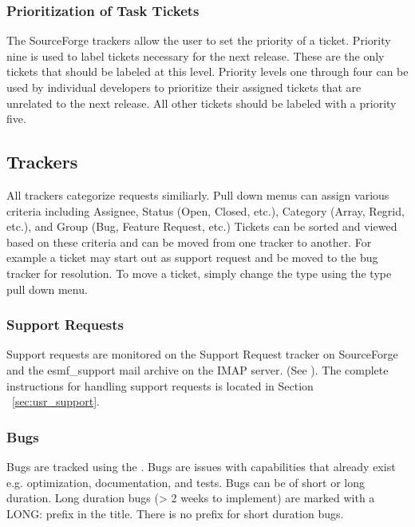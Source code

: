 \subsubsection{Prioritization of Task Tickets}

The SourceForge trackers allow the user to set the priority of a ticket. Priority nine is used to label tickets necessary for the next release. These are the only tickets that should be labeled at this level. Priority levels one through four can be used by individual developers to prioritize their assigned 
tickets that are unrelated to the next release. All other tickets should be labeled with a priority five.

\subsection{Trackers}
\label{tracking_tools}

All trackers categorize requests similiarly. Pull down menus can assign various criteria including Assignee, Status (Open, Closed, etc.), Category (Array, Regrid, etc.), and Group (Bug, Feature Request, etc.)  Tickets can be sorted and viewed based on these criteria and can be moved from one tracker to another. For example a ticket may start out as support request and be moved to the bug tracker for resolution.  To move a ticket, simply change the type using the type pull down menu. 

\subsubsection{Support Requests}

Support requests are monitored on the Support Request tracker on SourceForge and the esmf\_support mail archive on the IMAP server. (See ). The complete instructions for handling support requests is located in Section ~\ref{sec:usr_support}.

\subsubsection{Bugs}

Bugs are tracked using the . Bugs are issues with capabilities that already exist e.g. optimization, documentation, and tests. Bugs can be of short or long duration.  Long duration bugs (> 2 weeks to implement) are marked with a LONG: prefix in the title.  There is no prefix for short duration bugs.

